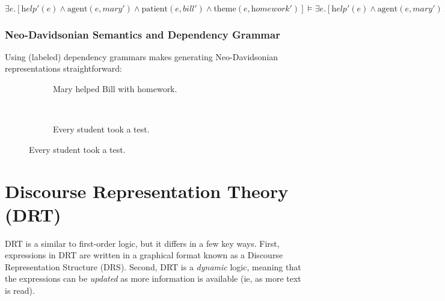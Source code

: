 \documentclass[11pt,letterpaper]{article}
\begin{document}
~~~~ $\exists e.[\textit{help}'(e) \land \text{agent}(e, \textit{mary}') \land \text{patient}(e, \textit{bill}') \land \text{theme}(e, \textit{homework}')] \vDash \exists e.[\textit{help}'(e) \land \text{agent}(e, \textit{mary}') \land \text{patient}(e, \textit{bill}')]$


\subsubsection{Neo-Davidsonian Semantics and Dependency Grammar}

Using (labeled) dependency grammars makes generating Neo-Davidsonian representations straightforward:

\begin{figure}[h]
  \centering
  \begin{subfigure}[b]{0.4\textwidth}
  \caption{Mary helped Bill with homework.}
  \end{subfigure}%
  ~~~~~~~ ~~
  \begin{subfigure}[b]{0.4\textwidth}
  \caption{Every student took a test.}
  \end{subfigure}
\end{figure}


\section{Discourse Representation Theory (DRT)}

DRT is a similar to first-order logic, but it differs in a few key ways.  First, expressions in DRT are written in a graphical format known as a Discourse Representation Structure (DRS).  Second, DRT is a \textit{dynamic} logic, meaning that the expressions can be \textit{updated} as more information is available (ie, as more text is read).
\end{document}

